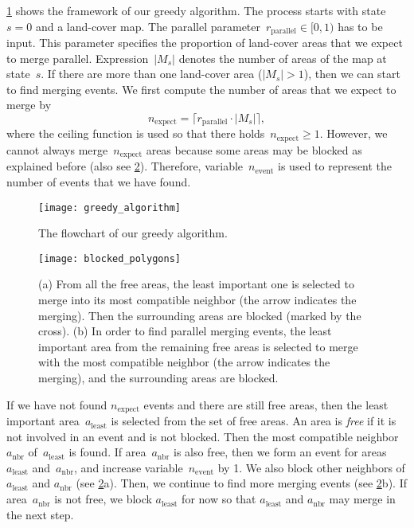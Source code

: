 \documentclass[ijgi,article,submit,moreauthors,pdftex]{Definitions/mdpi}
\begin{document}
\fig\ref{fig:greedy_framework} shows the framework of our greedy algorithm.
The process starts with state~$s=0$ and a land-cover map.
The parallel parameter~$r_\mathrm{parallel} \in [0,1)$ has to be input.
This parameter specifies the proportion of land-cover areas that
we expect to merge parallel.
Expression~$|M_s|$ denotes the number of areas of the map at state~$s$.
If there are more than one land-cover area ($|M_s|>1$),
then we can start to find merging events.
We first compute the number of areas that we expect to merge by
\begin{equation}
\label{eq:n_expect}
n_\mathrm{expect} =
\lceil r_\mathrm{parallel} \cdot |M_s| \rceil,
\end{equation}
where the ceiling function is used so that 
there holds~$n_\mathrm{expect}\ge 1$.
However, we cannot always merge~$n_\mathrm{expect}$ areas
because some areas may be blocked as explained before
(also see \fig\ref{fig:blocked_polygons}).
Therefore, variable~$n_\mathrm{event}$ is used
to represent the number of events that we have found. 


\begin{figure}[tb]
\centering
\texttt{[image: greedy\_algorithm]}
\caption{The flowchart of our greedy algorithm.
}
\label{fig:greedy_framework}
\end{figure}


\begin{figure}[tb]
\centering
\texttt{[image: blocked\_polygons]}
\caption{(a) From all the free areas,
	the least important one is selected to merge into
	its most compatible neighbor (the arrow indicates the merging).
	Then the surrounding areas are blocked (marked by the cross).
	(b) In order to find parallel merging events, 
	the least important area from the remaining free areas
	is selected to merge with the most compatible neighbor
	(the arrow indicates the merging),
	and the surrounding areas are blocked.
}
\label{fig:blocked_polygons}
\end{figure}

If we have not found $n_\mathrm{expect}$ events 
and there are still free areas,
then the least important area~$a_\mathrm{least}$ is selected
from the set of free areas.
An area is \emph{free} if 
it is not involved in an event and is not blocked.
Then the most compatible neighbor~$a_\mathrm{nbr}$ 
of~$a_\mathrm{least}$ is found.
If area~$a_\mathrm{nbr}$ is also free, 
then we form an event for areas~$a_\mathrm{least}$ and~$a_\mathrm{nbr}$,
and increase variable~$n_\mathrm{event}$ by 1.
We also block other neighbors of $a_\mathrm{least}$ and $a_\mathrm{nbr}$
(see \fig\ref{fig:blocked_polygons}a).
Then, we continue to find more merging events
(see \fig\ref{fig:blocked_polygons}b).
If area~$a_\mathrm{nbr}$ is not free,
we block $a_\mathrm{least}$ for now
so that $a_\mathrm{least}$ and $a_\mathrm{nbr}$ 
may merge in the next step.
\end{document}
